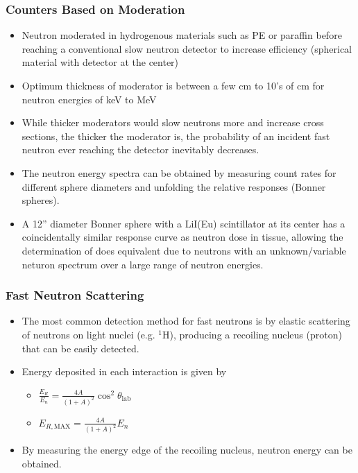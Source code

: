 \subsubsection{Counters Based on Moderation}
\begin{itemize}
    \item Neutron moderated in hydrogenous materials such as PE or paraffin before reaching a conventional slow neutron detector to increase efficiency (spherical material with detector at the center)
    \item Optimum thickness of moderator is between a few cm to 10's of cm for neutron energies of keV to MeV
    \item While thicker moderators would slow neutrons more and increase cross sections, the thicker the moderator is, the probability of an incident fast neutron ever reaching the detector inevitably decreases. 
    \item The neutron energy spectra can be obtained by measuring count rates for different sphere diameters and unfolding the relative responses (Bonner spheres). 
    \item A 12'' diameter Bonner sphere with a LiI(Eu) scintillator at its center has a coincidentally similar response curve as neutron dose in tissue, allowing the determination of does equivalent due to neutrons with an unknown/variable neturon spectrum over a large range of neutron energies. 
\end{itemize}

\subsubsection{Fast Neutron Scattering}
\begin{itemize}
    \item The most common detection method for fast neutrons is by elastic scattering of neutrons on light nuclei (e.g. $^1$H), producing a recoiling nucleus (proton) that can be easily detected. 
    \item Energy deposited in each interaction is given by
    \begin{itemize}
        \item[] $\frac{E_R}{E_n}=\frac{4A}{(1+A)^2}\cos^2\theta_\text{lab}$
        \item[] $E_{R,\text{MAX}}=\frac{4A}{(1+A)^2}E_n$
    \end{itemize}
    \item By measuring the energy edge of the recoiling nucleus, neutron energy can be obtained. 
\end{itemize}

